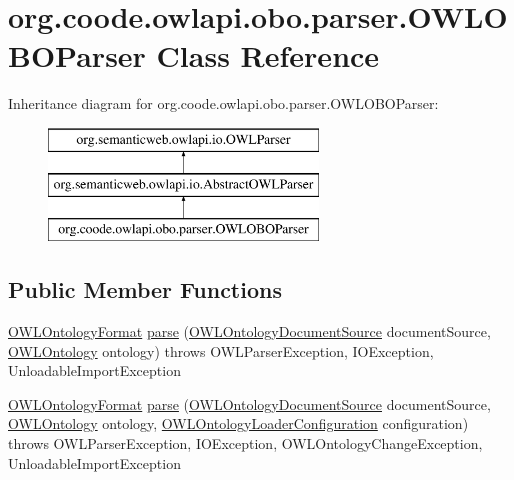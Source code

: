 \hypertarget{classorg_1_1coode_1_1owlapi_1_1obo_1_1parser_1_1_o_w_l_o_b_o_parser}{\section{org.\-coode.\-owlapi.\-obo.\-parser.\-O\-W\-L\-O\-B\-O\-Parser Class Reference}
\label{classorg_1_1coode_1_1owlapi_1_1obo_1_1parser_1_1_o_w_l_o_b_o_parser}
}
Inheritance diagram for org.\-coode.\-owlapi.\-obo.\-parser.\-O\-W\-L\-O\-B\-O\-Parser\-:\begin{figure}[H]
\begin{center}
\leavevmode
\includegraphics[height=3.000000cm]{classorg_1_1coode_1_1owlapi_1_1obo_1_1parser_1_1_o_w_l_o_b_o_parser}
\end{center}
\end{figure}
\subsection*{Public Member Functions}
\begin{DoxyCompactItemize}
\item 
\hyperlink{classorg_1_1semanticweb_1_1owlapi_1_1model_1_1_o_w_l_ontology_format}{O\-W\-L\-Ontology\-Format} \hyperlink{classorg_1_1coode_1_1owlapi_1_1obo_1_1parser_1_1_o_w_l_o_b_o_parser_a11be0dea807992da396126623066cfef}{parse} (\hyperlink{interfaceorg_1_1semanticweb_1_1owlapi_1_1io_1_1_o_w_l_ontology_document_source}{O\-W\-L\-Ontology\-Document\-Source} document\-Source, \hyperlink{interfaceorg_1_1semanticweb_1_1owlapi_1_1model_1_1_o_w_l_ontology}{O\-W\-L\-Ontology} ontology)  throws O\-W\-L\-Parser\-Exception, I\-O\-Exception, Unloadable\-Import\-Exception 
\item 
\hyperlink{classorg_1_1semanticweb_1_1owlapi_1_1model_1_1_o_w_l_ontology_format}{O\-W\-L\-Ontology\-Format} \hyperlink{classorg_1_1coode_1_1owlapi_1_1obo_1_1parser_1_1_o_w_l_o_b_o_parser_aab30605317c3e6b3e1388eae9caaf7e4}{parse} (\hyperlink{interfaceorg_1_1semanticweb_1_1owlapi_1_1io_1_1_o_w_l_ontology_document_source}{O\-W\-L\-Ontology\-Document\-Source} document\-Source, \hyperlink{interfaceorg_1_1semanticweb_1_1owlapi_1_1model_1_1_o_w_l_ontology}{O\-W\-L\-Ontology} ontology, \hyperlink{classorg_1_1semanticweb_1_1owlapi_1_1model_1_1_o_w_l_ontology_loader_configuration}{O\-W\-L\-Ontology\-Loader\-Configuration} configuration)  throws O\-W\-L\-Parser\-Exception, I\-O\-Exception, O\-W\-L\-Ontology\-Change\-Exception, Unloadable\-Import\-Exception 
\end{DoxyCompactItemize}
